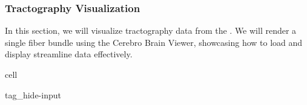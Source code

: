 \documentclass[letterpaper,10pt,english]{jupyterBook}
\begin{document}
\subsubsection{Tractography Visualization}
\label{\detokenize{chapters/03/03c_visualization-examples:tractography-visualization}}
\sphinxAtStartPar
In this section, we will visualize tractography data from the . We will render a single fiber bundle using the Cerebro Brain Viewer, showcasing how to load and display streamline data effectively.

\begin{sphinxuseclass}{cell}
\begin{sphinxuseclass}{tag_hide-input}
\end{sphinxuseclass}
\end{sphinxuseclass}
\end{document}
